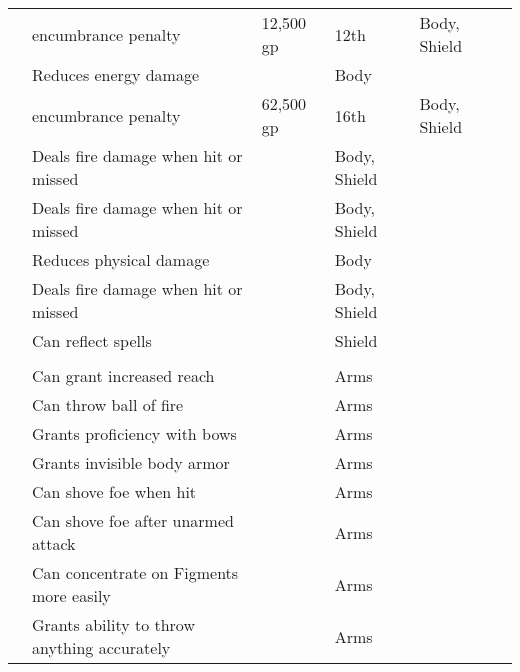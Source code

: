 \begin{longtabuwrapper}
\begin{longtabu}{l X l l l l}
                  &  encumbrance penalty & 12,500 gp & 12th & Body, Shield &  \\
                 & Reduces energy damage &  & Body &  \\
                  &  encumbrance penalty & 62,500 gp & 16th & Body, Shield &  \\
                 & Deals fire damage when hit or missed &  & Body, Shield &  \\
                 & Deals fire damage when hit or missed &  & Body, Shield &  \\
                 & Reduces physical damage &  & Body &  \\
                 & Deals fire damage when hit or missed &  & Body, Shield &  \\
                 & Can reflect spells &  & Shield &  \\

                \midrule
                 &  &  &  &  &  \\
                 & Can grant increased reach &  & Arms &  \\
                 & Can throw ball of fire &  & Arms &  \\
                 & Grants proficiency with bows &  & Arms &  \\
                 & Grants invisible body armor &  & Arms &  \\
                 & Can shove foe when hit &  & Arms &  \\
                 & Can shove foe after unarmed attack &  & Arms &  \\
                 & Can concentrate on Figments more easily &  & Arms &  \\
                 & Grants ability to throw anything accurately &  & Arms &  \\


\end{longtabu}
\end{longtabuwrapper}
